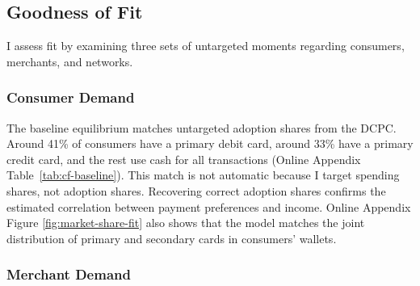 \documentclass[main.tex]{subfiles}
\begin{document}
\subsection{Goodness of Fit}

I assess fit by examining three sets of untargeted moments regarding consumers, merchants, and networks.

\subsubsection{Consumer Demand}

The baseline equilibrium matches untargeted adoption shares from the DCPC.
Around 41\% of consumers have a primary debit card, around 33\% have a primary credit card, and the rest use cash for all transactions (Online Appendix Table~\ref{tab:cf-baseline}).
This match is not automatic because I target spending shares, not adoption shares.
Recovering correct adoption shares confirms the estimated correlation between payment preferences and income.
Online Appendix Figure \ref{fig:market-share-fit} also shows that the model matches the joint distribution of primary and secondary cards in consumers' wallets.


\subsubsection{Merchant Demand}
\label{subsubsec:merchant-gof}
\end{document}
